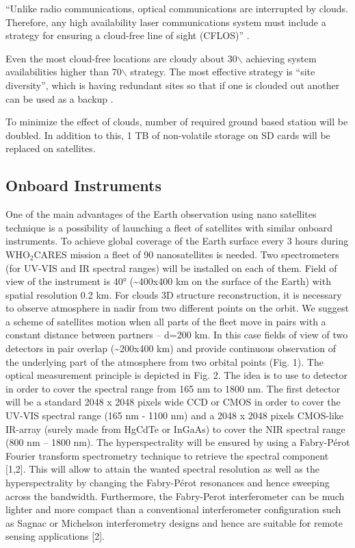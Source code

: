 \documentclass{scrartcl}
\newcommand{\whocares}{WHO$_2$CARES }
\begin{document}
``Unlike radio communications, optical communications are interrupted by
clouds. Therefore, any high availability laser communications system
must include a strategy for ensuring a cloud-free line of sight
(CFLOS)'' \citep{link}.

Even the most cloud-free locations are cloudy about 30$\backslash$%
achieving system availabilities higher than 70$\backslash$%
strategy. The most effective strategy is ``site diversity'', which is
having redundant sites so that if one is clouded out another can be used
as a backup \citep{link}.

To minimize the effect of clouds, number of required ground based
station will be doubled. In addition to this, 1 TB of non-volatile
storage on SD cards will be replaced on satellites.

\subsection{Onboard Instruments}
\label{sec:orgac81367}

One of the main advantages of the Earth observation using nano satellites
technique is a possibility of launching a fleet of satellites with similar
onboard instruments. To achieve global coverage of the Earth surface every 3
hours during \whocares mission a fleet of 90 nanosatellites is needed. Two
spectrometers (for UV-VIS and IR spectral ranges) will be installed on each of
them. Field of view of the instrument is 40° (\textasciitilde{}400x400 km on the surface of the
Earth) with spatial resolution 0.2 km. For clouds 3D structure reconstruction,
it is necessary to observe atmosphere in nadir from two different points on the
orbit. We suggest a scheme of satellites motion when all parts of the fleet move
in pairs with a constant distance between partners – d=200 km. In this case
fields of view of two detectors in pair overlap (\textasciitilde{}200x400 km) and provide
continuous observation of the underlying part of the atmosphere from two orbital
points (Fig. 1). The optical measurement principle is depicted in Fig. 2. The
idea is to use to detector in order to cover the spectral range from 165 nm to
1800 nm. The first detector will be a standard 2048 x 2048 pixels wide CCD or
CMOS in order to cover the UV-VIS spectral range (165 nm - 1100 nm) and a 2048 x
2048 pixels CMOS-like IR-array (surely made from HgCdTe or InGaAs) to cover the
NIR spectral range (800 nm – 1800 nm). The hyperspectrality will be ensured by
using a Fabry-Pérot Fourier transform spectrometry technique to retrieve the
spectral component [1,2]. This will allow to attain the wanted spectral
resolution as well as the hyperspectrality by changing the Fabry-Pérot
resonances and hence sweeping across the bandwidth. Furthermore, the Fabry-Perot
interferometer can be much lighter and more compact than a conventional
interferometer configuration such as Sagnac or Michelson interferometry designs
and hence are suitable for remote sensing applications [2].
\end{document}
